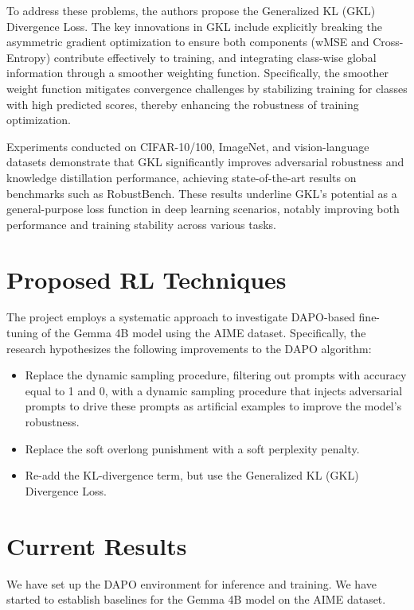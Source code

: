 \documentclass[11pt, oneside]{article}   	%
\begin{document}
To address these problems, the authors propose the Generalized KL (GKL) Divergence Loss. The key innovations in GKL include explicitly breaking the asymmetric gradient optimization to ensure both components (wMSE and Cross-Entropy) contribute effectively to training, and integrating class-wise global information through a smoother weighting function. Specifically, the smoother weight function mitigates convergence challenges by stabilizing training for classes with high predicted scores, thereby enhancing the robustness of training optimization.

Experiments conducted on CIFAR-10/100, ImageNet, and vision-language datasets demonstrate that GKL significantly improves adversarial robustness and knowledge distillation performance, achieving state-of-the-art results on benchmarks such as RobustBench. These results underline GKL’s potential as a general-purpose loss function in deep learning scenarios, notably improving both performance and training stability across various tasks.


\section*{Proposed RL Techniques}

The project employs a systematic approach to investigate DAPO-based fine-tuning of the Gemma 4B model using the AIME dataset. Specifically, the research hypothesizes the following improvements to the DAPO algorithm:

\begin{itemize}
	\item Replace the dynamic sampling procedure, filtering out prompts with accuracy equal to 1 and 0, with a dynamic sampling procedure that injects adversarial prompts to drive these prompts as artificial examples to improve the model's robustness.
	\item Replace the soft overlong punishment with a soft perplexity penalty.
	\item Re-add the KL-divergence term, but use the Generalized KL (GKL) Divergence Loss.
\end{itemize}

\section*{Current Results}
We have set up the DAPO environment for inference and training. We have started to establish baselines for the Gemma 4B model on the AIME dataset.
\end{document}
